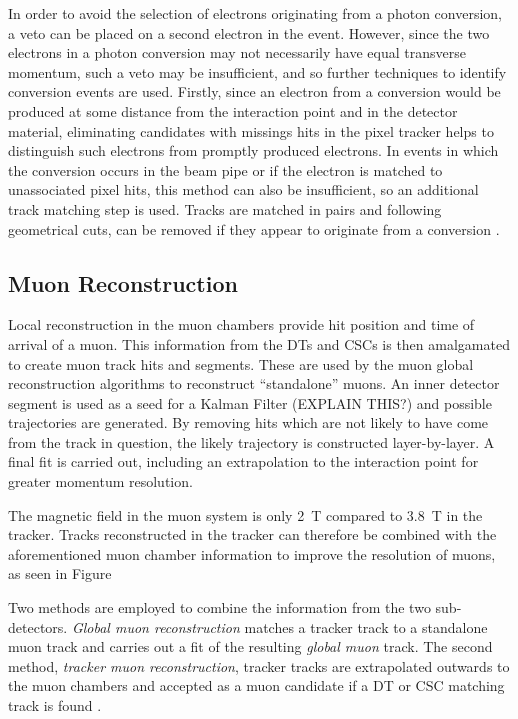 In order to avoid the selection of electrons originating from a photon conversion, a veto can be placed on a
second electron in the event. However, since the two electrons in a photon conversion may not necessarily have
equal transverse momentum, such a veto may be insufficient, and so further techniques to identify conversion
events are used. Firstly, since an electron from a conversion would be produced at some distance from the
interaction point and in the detector material, eliminating candidates with missings hits in the pixel tracker
helps to distinguish such electrons from promptly produced electrons. In events in which the conversion occurs
in the beam pipe or if the electron is matched to unassociated pixel hits, this method can also be
insufficient, so an additional track matching step is used. Tracks are matched in pairs and following
geometrical cuts, can be removed if they appear to originate from a conversion \cite{electron_reconstruction}.

\subsection{Muon Reconstruction}
\label{ss:muon_reconstruction}
Local reconstruction in the muon chambers provide hit position and time of arrival of a muon. This information
from the DTs and CSCs is then amalgamated to create muon track hits and segments. These are used by the muon
global reconstruction algorithms to reconstruct ``standalone'' muons. An inner detector segment is used as a
seed for a Kalman Filter (EXPLAIN THIS?) \cite{kalman_filter, Speer:927395} and possible trajectories are
generated. By removing hits which are not likely to have come from the track in question, the likely trajectory is
constructed layer-by-layer. A final fit is carried out, including an extrapolation to the interaction point
for greater momentum resolution.

The magnetic field in the muon system is only 2~T compared to 3.8~T in the tracker. Tracks reconstructed in
the tracker can therefore be combined with the aforementioned muon chamber information to improve the
\pt resolution of muons, as seen in Figure%

Two methods are employed to combine the information from the two sub-detectors. \textit{Global muon
reconstruction} matches a tracker track to a standalone muon track and carries out a fit of the resulting
\textit{global muon} track. The second method, \textit{tracker muon reconstruction}, tracker tracks are
extrapolated outwards to the muon chambers and accepted as a muon candidate if a DT or CSC matching track is
found \cite{muon_reconstruction}.

